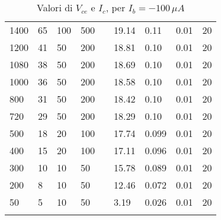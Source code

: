 \begin{longtable}[c]{|l|l|l|l|l|l|l|l|l|}
    1400          & 65                        & 100                       & 500                        &  & 19.14      & 0.11                      & 0.01                       & 20                         \\ \cline{1-4} \cline{6-9}
    1200          & 41                        & 50                        & 200                        &  & 18.81      & 0.10                     & 0.01                       & 20                         \\ \cline{1-4} \cline{6-9}
    1080          & 38                        & 50                        & 200                        &  & 18.69      & 0.10                      & 0.01                       & 20                         \\ \cline{1-4} \cline{6-9}
    1000          & 36                        & 50                        & 200                        &  & 18.58      & 0.10                      & 0.01                       & 20                         \\ \cline{1-4} \cline{6-9}
    800           & 31                        & 50                        & 200                        &  & 18.42      & 0.10                      & 0.01                       & 20                         \\ \cline{1-4} \cline{6-9}
    720           & 29                        & 50                        & 200                        &  & 18.29      & 0.10                      & 0.01                       & 20                         \\ \cline{1-4} \cline{6-9}
    500           & 18                        & 20                        & 100                        &  & 17.74      & 0.099                      & 0.01                       & 20                         \\ \cline{1-4} \cline{6-9}
    400           & 15                        & 20                        & 100                        &  & 17.11      & 0.096                      & 0.01                       & 20                         \\ \cline{1-4} \cline{6-9}
    300           & 10                        & 10                        & 50                         &  & 15.78      & 0.089                      & 0.01                       & 20                         \\ \cline{1-4} \cline{6-9}
    200           & 8                         & 10                        & 50                         &  & 12.46      & 0.072                      & 0.01                       & 20                         \\ \cline{1-4} \cline{6-9}
    50            & 5                         & 10                        & 50                         &  & 3.19       & 0.026                      & 0.01                       & 20                         \\ \cline{1-4} \cline{6-9}
    
    \caption{\label{tab:Tabella2}{Valori di $V_{ce}$ e $I_c$, per $I_b=-100\,\mu A$}}                                                                                                                            \\
\end{longtable}
